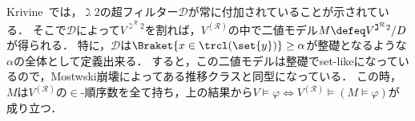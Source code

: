 \documentclass[realisability.tex]{subfiles}
\begin{document}
Krivine~\cite{Krivine:2014yu}では，$\gimel 2$の超フィルター$\mathcal{D}$が常に付加されていることが示されている．
そこで$\mathcal{D}$によって$V^{\gimel^{\mathcal{R}} 2}$を割れば，$V^{(\mathcal{R})}$の中で二値モデル$M \defeq V^{\gimel^{\mathcal{R}} 2}/D$が得られる．
特に，$\mathcal{D}$は$\Braket{x \in \trcl(\set{y})} \geq \alpha$が整礎となるような$\alpha$の全体として定義出来る．
すると，この二値モデルは整礎でset-likeになっているので，Mostwski崩壊によってある推移クラスと同型になっている．
この時，$M$は$V^{(\mathcal{R})}$の$\in$-順序数を全て持ち，上の結果から$V \models \varphi \iff V^{(\mathcal{R})} \models (M \models \varphi)$が成り立つ．
\end{document}
